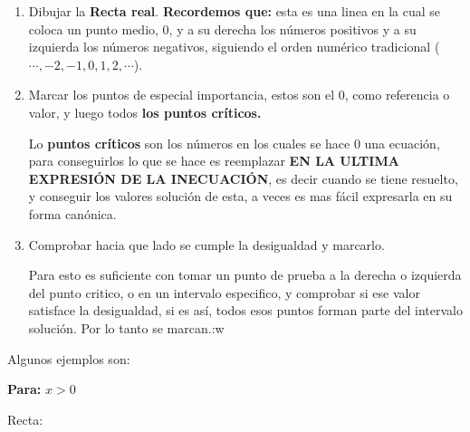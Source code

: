 \documentclass[12pt]{article}
\begin{document}
    \begin{enumerate}
        \item Dibujar la \textbf{Recta real}. \textbf{Recordemos que:} esta es una
            linea en la cual se coloca un punto medio, 0, y a su derecha los números
            positivos y a su izquierda los números negativos, siguiendo el orden
            numérico tradicional ($\cdots,-2,-1,0,1,2,\cdots$).

        \item Marcar los puntos de especial importancia, estos son el 0, como
            referencia o valor, y luego todos \textbf{los puntos críticos.}

            Lo \textbf{puntos críticos} son los números en los cuales se hace 0
            una ecuación, para conseguirlos lo que se hace es reemplazar \textbf{
            EN LA ULTIMA EXPRESIÓN DE LA INECUACIÓN}, es decir cuando se tiene
            resuelto, y  conseguir los valores solución de esta, a veces es mas
            fácil expresarla en su forma canónica.

        \item Comprobar hacia que lado se cumple la desigualdad y marcarlo.

            Para esto es suficiente con tomar un punto de prueba a la derecha o
            izquierda del punto critico, o en un intervalo especifico, y comprobar
            si ese valor satisface la desigualdad, si es así, todos esos puntos
            forman parte del intervalo solución. Por lo tanto se marcan.:w

    \end{enumerate}

    Algunos ejemplos son:

    \textbf{Para: } $x>0$

    Recta:

    \vspace*{1cm}
\end{document}
